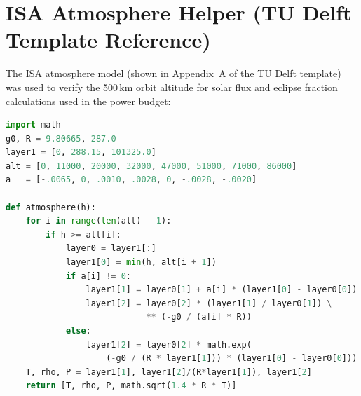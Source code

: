 \section*{ISA Atmosphere Helper (TU Delft Template Reference)}

The ISA atmosphere model (shown in Appendix~A of the TU Delft template) was used to verify the 500\,km orbit altitude for solar flux and eclipse fraction calculations used in the power budget:

\begin{lstlisting}[language=Python, caption={ISA Calculator used for orbit power budget verification. Adapted from TU Delft report template Appendix A.}]
import math
g0, R = 9.80665, 287.0
layer1 = [0, 288.15, 101325.0]
alt = [0, 11000, 20000, 32000, 47000, 51000, 71000, 86000]
a   = [-.0065, 0, .0010, .0028, 0, -.0028, -.0020]

def atmosphere(h):
    for i in range(len(alt) - 1):
        if h >= alt[i]:
            layer0 = layer1[:]
            layer1[0] = min(h, alt[i + 1])
            if a[i] != 0:
                layer1[1] = layer0[1] + a[i] * (layer1[0] - layer0[0])
                layer1[2] = layer0[2] * (layer1[1] / layer0[1]) \
                            ** (-g0 / (a[i] * R))
            else:
                layer1[2] = layer0[2] * math.exp(
                    (-g0 / (R * layer1[1])) * (layer1[0] - layer0[0]))
    T, rho, P = layer1[1], layer1[2]/(R*layer1[1]), layer1[2]
    return [T, rho, P, math.sqrt(1.4 * R * T)]
\end{lstlisting}
